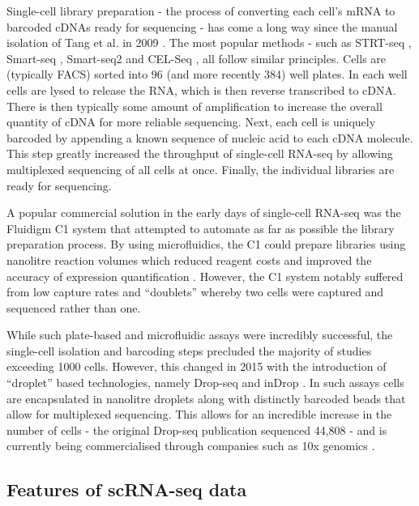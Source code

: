 Single-cell library preparation - the process of converting each cell's mRNA to barcoded cDNAs ready for sequencing - has come a long way since the manual isolation of Tang et al. in 2009 \cite{Tang2009-th}. The most popular methods - such as 
STRT-seq \cite{islam2011characterization}, 
Smart-seq \cite{Ramskold2012-wt}, 
Smart-seq2 \cite{Picelli2013-tm} and 
CEL-Seq \cite{hashimshony2012cel},
all follow similar principles. Cells are (typically FACS) sorted into 96 (and more recently 384) well plates. In each well cells are lysed to release the RNA, which is then reverse transcribed to cDNA. There is then typically some amount of amplification to increase the overall quantity of cDNA for more reliable sequencing. Next, each cell is uniquely barcoded by appending a known sequence of nucleic acid to each cDNA molecule. This step greatly increased the throughput of single-cell RNA-seq by allowing multiplexed sequencing of all cells at once. Finally, the individual libraries are ready for sequencing.



A popular commercial solution in the early days of single-cell RNA-seq was the Fluidigm C1 system that attempted to automate as far as possible the library preparation process. By using microfluidics, the C1 could prepare libraries using nanolitre reaction volumes which reduced reagent costs and improved the accuracy of expression quantification \cite{pollen2014low}. However, the C1 system notably suffered from low capture rates and ``doublets'' whereby two cells were captured and sequenced rather than one.

While such plate-based and microfluidic assays were incredibly successful, the single-cell isolation and barcoding steps precluded the majority of studies exceeding 1000 cells. However, this changed in 2015 with the introduction of ``droplet'' based technologies, namely Drop-seq \cite{Macosko2015-ek} and inDrop \cite{klein2015droplet}. In such assays cells are encapsulated in nanolitre droplets along with distinctly barcoded beads that allow for multiplexed sequencing. This allows for an incredible increase in the number of cells - the original Drop-seq publication sequenced 44,808 - and is currently being commercialised through companies such as 10x genomics \cite{Zheng2017-vj}.

\subsection{Features of scRNA-seq data}

